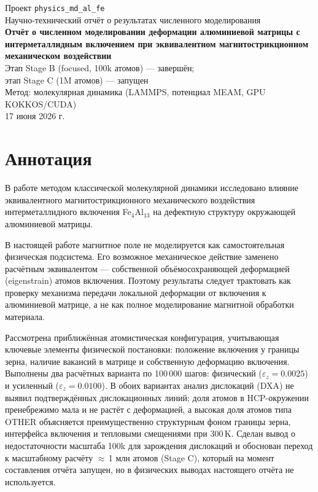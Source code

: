 \documentclass[14pt,a4paper]{extarticle}
\newcommand{\code}[1]{\texttt{#1}}
\begin{document}
\thispagestyle{empty}
\begin{center}
\vspace*{2.5cm}
{\large Проект \code{physics\_md\_al\_fe}}\\[0.4cm]
{\large Научно-технический отчёт о результатах численного моделирования}\\[2.2cm]

{\LARGE\bfseries Отчёт о численном моделировании деформации алюминиевой матрицы с интерметаллидным включением при эквивалентном магнитострикционном механическом воздействии}\\[2.2cm]

{\large Этап Stage B (focused, 100k атомов) — завершён;\\[0.2cm]
этап Stage C (1M атомов) — запущен}\\[1.6cm]

{\large Метод: молекулярная динамика (LAMMPS, потенциал MEAM, GPU KOKKOS/CUDA)}\\[2.6cm]

\vfill
{\large 17 июня 2026 г.}
\end{center}
\newpage

\section*{Аннотация}
В работе методом классической молекулярной динамики исследовано влияние эквивалентного магнитострикционного механического воздействия интерметаллидного включения Fe$_4$Al$_{13}$ на дефектную структуру окружающей алюминиевой матрицы.

В настоящей работе магнитное поле не моделируется как самостоятельная физическая подсистема. Его возможное механическое действие заменено расчётным эквивалентом — собственной объёмосохраняющей деформацией (eigenstrain) атомов включения. Поэтому результаты следует трактовать как проверку механизма передачи локальной деформации от включения к алюминиевой матрице, а не как полное моделирование магнитной обработки материала.

Рассмотрена приближённая атомистическая конфигурация, учитывающая ключевые элементы физической постановки: положение включения у границы зерна, наличие вакансий в матрице и собственную деформацию включения. Выполнены два расчётных варианта по 100\,000 шагов: физический ($\varepsilon_z = 0.0025$) и усиленный ($\varepsilon_z = 0.0100$). В обоих вариантах анализ дислокаций (DXA) не выявил подтверждённых дислокационных линий; доля атомов в HCP-окружении пренебрежимо мала и не растёт с деформацией, а высокая доля атомов типа OTHER объясняется преимущественно структурным фоном границы зерна, интерфейса включения и тепловыми смещениями при 300\,K. Сделан вывод о недостаточности масштаба 100k для зарождения дислокаций и обоснован переход к масштабному расчёту $\approx$\,1 млн атомов (Stage C), который на момент составления отчёта запущен, но в физических выводах настоящего отчёта не используется.
\end{document}
